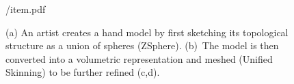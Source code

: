 \providecommand{\yoff}{0}
\begin{figure}[t!]
\centering
\begin{overpic} 
[width=\linewidth]
{\currfiledir/item.pdf}
\end{overpic}
\caption{
% 
%
(a) An artist creates a hand model by first sketching its topological structure as a union of spheres (ZSphere{\textcopyright}). (b)~The model is then converted into a volumetric representation and meshed (Unified Skinning{\textcopyright}) to be further refined (c,d).
% 
% 
}
\label{fig:zsphere}
\end{figure}